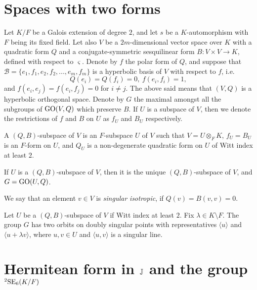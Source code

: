 
\section{Spaces with two forms}

Let $K / F$ be a Galois extension of degree $2$, 
and let $s$ be a $K$-automorphism
with $F$ being its fixed field. Let also $V$ be a $2m$-dimensional vector space over $K$ with 
a quadratic form $Q$ and a conjugate-symmetric sesquilinear form 
\mbox{$B : V\times V \rightarrow K$},
defined with respect to $\varsigma$. Denote by $f$ the polar form of $Q$, and suppose that 
\mbox{$\mathcal{B} = \{ e_1, f_1, e_2, f_2, ..., e_m, f_m \}$}
is a hyperbolic basis of $V$ with respect to $f$, i.e.
\begin{equation}
	Q(e_i) = Q(f_i) = 0,\ f(e_i, f_i) = 1,
\end{equation}
and $f(e_i,e_j) = f(e_i,f_j) = 0$ for $i \neq j$. The above said means that $(V,Q)$ is a hyperbolic
orthogonal space. Denote by $G$ the maximal amongst all the subgroups of 
$\mathrm{GO}(V, Q)$ which preserve $B$. If $U$ 
is a subspace of $V$, then we denote the restrictions of $f$ and $B$ on $U$ as $f_U$ and $B_U$ 
respectively. 

\begin{definition}
	A $(Q,B)$-subspace of $V$ is an $F$-subspace $U$ of $V$ such that \mbox{$V = U \otimes_F K$}, 
	$f_U = B_U$ is an $F$-form on $U$, and $Q_U$ is a non-degenerate quadratic form on $U$ of 
	Witt index at least $2$. 
\end{definition}

\begin{proposition}
	If $U$ is a $(Q,B)$-subspace of $V$, then it is the unique $(Q,B)$-subspace of $V$, and
	$G = \mathrm{GO}(U,Q)$. 
\end{proposition}

We say that an element $v \in V$ is \textit{singular isotropic}, if $Q(v) = B(v,v) = 0$. 

\begin{proposition}
	\label{prop:3_2forms_orbits}
	Let $U$ be a $(Q,B)$-subspace of $V$ if Witt index at least $2$. Fix $\lambda \in K 
	\setminus F$. The group $G$ has two orbits on doubly singular points with representatives
	$\langle u \rangle$ and $\langle u + \lambda v \rangle$, where $u,v \in U$ and 
	$\langle u, v \rangle$ 	is a singular line. 
\end{proposition}

\section{Hermitean form in $\mathbb{J}$ and the group ${}^2\mathrm{SE}_6(K/F)$}


